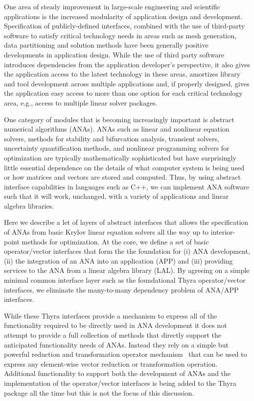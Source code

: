 \documentclass[pdf,ps2pdf,11pt]{SANDreport}
\begin{document}
One area of steady improvement in large-scale engineering and
scientific applications is the increased modularity of application
design and development.  Specification of publicly-defined interfaces,
combined with the use of third-party software to satisfy critical
technology needs in areas such as mesh generation, data partitioning
and solution methods have been generally positive developments in
application design.  While the use of third party software introduces
dependencies from the application developer's perspective, it also
gives the application access to the latest technology in these areas,
amortizes library and tool development across multiple applications
and, if properly designed, gives the application easy access to more
than one option for each critical technology area, e.g., access to
multiple linear solver packages.

One category of modules that is becoming increasingly important is abstract
numerical algorithms (ANAs).  ANAs such as linear and nonlinear equation
solvers, methods for stability and bifurcation analysis, transient solvers,
uncertainty quantification methods, and nonlinear programming solvers for
optimization are typically mathematically sophisticated but have surprisingly
little essential dependence on the details of what computer system is being
used or how matrices and vectors are stored and computed.  Thus, by using
abstract interface capabilities in languages such as C++, we can implement ANA
software such that it will work, unchanged, with a variety of applications and
linear algebra libraries.


Here we describe a let of layers of abstract interfaces that allows the
specification of ANAs from basic Krylov linear equation solvers all the way up
to interior-point methods for optimization.  At the core, we define a set of
basic operator/vector interfaces that form the the foundation for (i) ANA
development, (ii) the integration of an ANA into an application (APP) and
(iii) providing services to the ANA from a linear algebra library (LAL).  By
agreeing on a simple minimal common interface layer such as the foundational
Thyra operator/vector interfaces, we eliminate the many-to-many dependency
problem of ANA/APP interfaces.

While these Thyra interfaces provide a mechanism to express all of the
functionality required to be directly used in ANA development it does not
attempt to provide a full collection of methods that directly support the
anticipated functionality needs of ANAs.  Instead they rely on a simple but
powerful reduction and transformation operator mechanism~\cite{ref:rtop_toms}
that can be used to express any element-wise vector reduction or
transformation operation.  Additional functionality to support both the
development of ANAs and the implementation of the operator/vector interfaces
is being added to the Thyra package all the time but this is not the focus of
this discussion.
\end{document}
